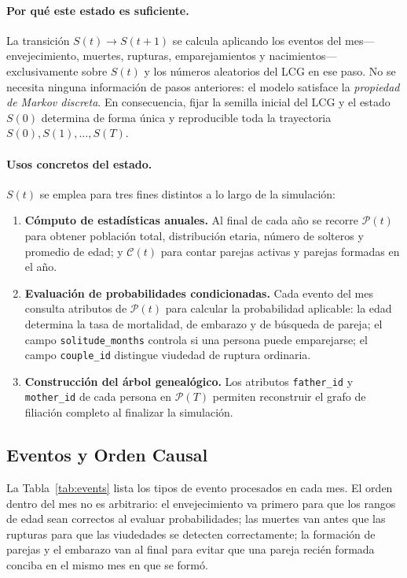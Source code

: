 \documentclass{llncs}
\begin{document}
\paragraph{Por qué este estado es suficiente.}
La transición $S(t) \to S(t+1)$ se calcula aplicando los eventos del
mes---envejecimiento, muertes, rupturas, emparejamientos y
nacimientos---exclusivamente sobre $S(t)$ y los números aleatorios del LCG en
ese paso.
No se necesita ninguna información de pasos anteriores: el modelo satisface la
\emph{propiedad de Markov discreta}.
En consecuencia, fijar la semilla inicial del LCG y el estado $S(0)$ determina
de forma única y reproducible toda la trayectoria $S(0), S(1), \ldots, S(T)$.

\paragraph{Usos concretos del estado.}
$S(t)$ se emplea para tres fines distintos a lo largo de la simulación:
\begin{enumerate}
  \item \textbf{Cómputo de estadísticas anuales.} Al final de cada año se
        recorre $\mathcal{P}(t)$ para obtener población total, distribución
        etaria, número de solteros y promedio de edad; y $\mathcal{C}(t)$ para
        contar parejas activas y parejas formadas en el año.
  \item \textbf{Evaluación de probabilidades condicionadas.} Cada evento del
        mes consulta atributos de $\mathcal{P}(t)$ para calcular la
        probabilidad aplicable: la edad determina la tasa de mortalidad, de
        embarazo y de búsqueda de pareja; el campo \texttt{solitude\_months}
        controla si una persona puede emparejarse; el campo
        \texttt{couple\_id} distingue viudedad de ruptura ordinaria.
  \item \textbf{Construcción del árbol genealógico.} Los atributos
        \texttt{father\_id} y \texttt{mother\_id} de cada persona en
        $\mathcal{P}(T)$ permiten reconstruir el grafo de filiación completo
        al finalizar la simulación.
\end{enumerate}

\subsection{Eventos y Orden Causal}

La Tabla~\ref{tab:events} lista los tipos de evento procesados en cada mes.
El orden dentro del mes no es arbitrario: el envejecimiento va primero
para que los rangos de edad sean correctos al evaluar probabilidades;
las muertes van antes que las rupturas para que las viudedades se detecten
correctamente; la formación de parejas y el embarazo van al final para
evitar que una pareja recién formada conciba en el mismo mes en que
se formó.
\end{document}
